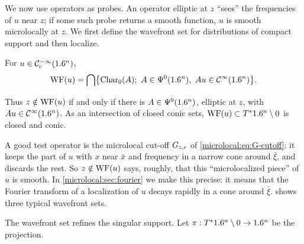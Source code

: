 We now use operators as probes. An operator elliptic at $z$ ``sees'' the
frequencies of $u$ near $z$; if some such probe returns a smooth function, $u$
is smooth microlocally at $z$. We first define the wavefront set for
distributions of compact support and then localize.

\begin{definition}\label{microlocal:def:wf-compact}
  For $u\in\mathcal{C}^{-\infty}_{\mathrm{c}}(1.6^n)$,
  \begin{equation*}
    \WF(u)=\bigcap\bigl\{\Char_0(A);\ A\in\Psido0(\R^n),\ Au\in\CI(\R^n)\bigr\}.
  \end{equation*}
\end{definition}

Thus $z\notin\operatorname{WF}(u)$ if and only if there is $A\in\Psi^{0}(1.6^n)$, elliptic at
$z$, with $Au\in\mathcal{C}^\infty(1.6^n)$. As an intersection of closed conic sets,
$\operatorname{WF}(u)\subset T^*1.6^n\setminus0$ is closed and conic.

\begin{discussion}
  A good test operator is the microlocal cut-off $G_{z,\epsilon}$ of
  \eqref{microlocal:eq:G-cutoff}: it keeps the part of $u$ with $x$ near
  $\bar x$ and frequency in a narrow cone around $\bar\xi$, and discards the
  rest. So $z\notin\operatorname{WF}(u)$ says, roughly, that this ``microlocalized piece'' of
  $u$ is smooth. In \cref{microlocal:sec:fourier} we make this precise: it
  means that the Fourier transform of a localization of $u$ decays rapidly in
  a cone around $\bar\xi$.  shows three
  typical wavefront sets.
\end{discussion}

The wavefront set refines the
singular support. Let $\pi:T^*1.6^n\setminus0\to1.6^n$ be the projection.

